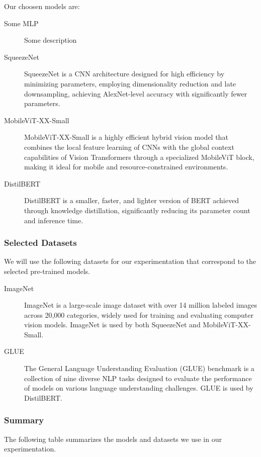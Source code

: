 \documentclass{article}
\begin{document}
Our choosen models are:
\begin{description}
	\item[Some MLP] {Some description}
	\item[SqueezeNet \cite{squeezenet}] SqueezeNet is a CNN architecture designed for high efficiency by minimizing parameters, employing dimensionality reduction and late downsampling, achieving AlexNet-level accuracy with significantly fewer parameters.
	\item[MobileViT-XX-Small \cite{mobilevit}] MobileViT-XX-Small is a highly efficient hybrid vision model that combines the local feature learning of CNNs with the global context capabilities of Vision Transformers through a specialized MobileViT block, making it ideal for mobile and resource-constrained environments.
	\item[DistilBERT \cite{distilbert}] DistilBERT is a smaller, faster, and lighter version of BERT achieved through knowledge distillation, significantly reducing its parameter count and inference time.
\end{description}

\subsubsection{Selected Datasets}
We will use the following datasets for our experimentation that correspond to the selected pre-trained models.

\begin{description}
	\item[ImageNet \cite{imagenet}] {
		ImageNet is a large-scale image dataset with over 14 million labeled images across 20,000 categories, widely used for training and evaluating computer vision models.
		ImageNet is used by both SqueezeNet and MobileViT-XX-Small.
		}
	\item[GLUE \cite{GLUE}] {
		The General Language Understanding Evaluation (GLUE) benchmark is a collection of nine diverse NLP tasks designed to evaluate the performance of models on various language understanding challenges.
		GLUE is used by DistilBERT.
		}
\end{description}

\subsubsection{Summary}

The following table summarizes the models and datasets we use in our experimentation.
\end{document}

